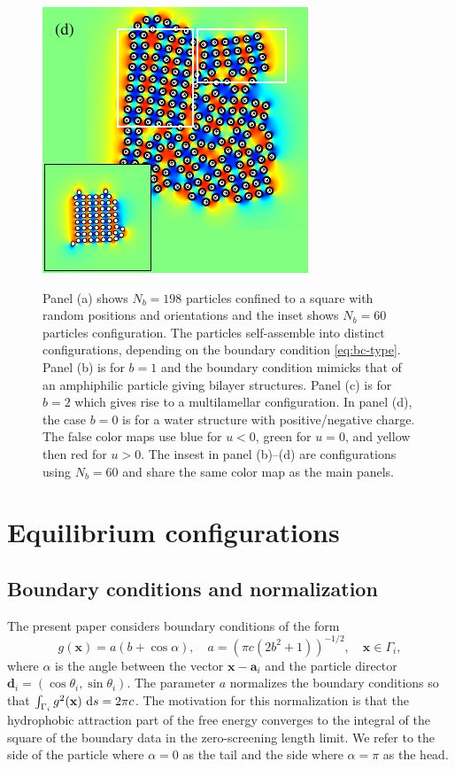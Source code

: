 \documentclass[prb,preprint,showpacs,preprintnumbers,amsmath,amssymb,longbibliography]{revtex4-1}
\renewcommand{\aa}{\mathbf{a}}
\newcommand{\dd}{\mathbf{d}}
\newcommand{\xx}{\mathbf{x}}
\begin{document}
\begin{figure}[h!]
\begin{center}
  \includegraphics[height=0.3\textheight]{Nb198d_eta_inset.pdf}
\end{center}
\begin{caption}{\label{fig:relax}
  Panel (a) shows $N_b = 198$ particles confined to a square with random 
  positions and orientations and the inset shows $N_b=60$ particles configuration.
  The particles self-assemble into distinct configurations,
  depending on the boundary condition \eqref{eq:bc-type}.
  Panel (b) is for $b=1$ and the boundary condition mimicks that
  of an amphiphilic particle giving bilayer structures. 
  Panel (c) is for $b=2$ which gives rise to a multilamellar configuration. 
  In panel (d), the case $b = 0$ is for a water structure with
  positive/negative charge. 
  The false color maps use blue for $u < 0$, green for $u = 0$, and yellow then red for $u > 0$.
  The insest in panel (b)--(d) are configurations using $N_b=60$ and share the same color map
  as the main panels.}
\end{caption}
\end{figure}

\section{Equilibrium configurations}
\subsection{Boundary conditions and normalization}
The present paper considers boundary conditions of the form
\begin{equation}
  \label{eq:bc-type}
g(\xx) = a(b + \cos \alpha),\quad a = (\pi c(2b^2 + 1))^{-1/2},\quad \xx \in \Gamma_i,
\end{equation}
where $\alpha$ is the angle between the vector $\xx - \aa_i$ and 
the particle director $\dd_i = (\cos \theta_i, \sin \theta_i)$.
The parameter $a$ normalizes the boundary conditions 
so that $\int_{\Gamma_i} g^2(\xx) \, \dif s =  2\pi c$.
The motivation for this normalization is that the hydrophobic attraction
part of the free energy converges to the integral of the square of the boundary
data in the zero-screening length limit.  
We refer to the side of the particle where $\alpha = 0$
as the tail and the side where $\alpha = \pi$ as the head. 
\end{document}
